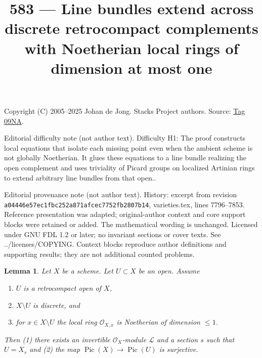 \documentclass{amsart}
\theoremstyle{plain}
\newtheorem{lemma}[subsection]{Lemma}
\theoremstyle{definition}
\theoremstyle{remark}
\numberwithin{equation}{subsection}
\def\Pic{\mathop{\mathrm{Pic}}\nolimits}
\begin{document}
\title[Stacks Project, Tag 09NA]{583 --- Line bundles extend across discrete retrocompact complements with Noetherian local rings of dimension at most one}
\maketitle
\noindent Copyright (C) 2005--2025 Johan de Jong. Stacks Project authors. Source: \href{https://stacks.math.columbia.edu/tag/09NA}{Tag 09NA}.

\noindent Editorial difficulty note (not author text). Difficulty H1: The proof constructs local equations that isolate each missing point even when the ambient scheme is not globally Noetherian. It glues these equations to a line bundle realizing the open complement and uses triviality of Picard groups on localized Artinian rings to extend arbitrary line bundles from that open..

\noindent Editorial provenance note (not author text). History: excerpt from revision \texttt{a0444\allowbreak 6e57e\allowbreak c1fbc\allowbreak 252a8\allowbreak 71afc\allowbreak ec775\allowbreak 2fb28\allowbreak 07b14}, varieties.tex, lines 7796--7853. Reference presentation was adapted; original-author context and core support blocks were retained or added. The mathematical wording is unchanged. Licensed under GNU FDL 1.2 or later; no invariant sections or cover texts. See ../licenses/COPYING. Context blocks reproduce author definitions and supporting results; they are not additional counted problems.

\begin{lemma}
\label{lemma-complement-codim-1-closed-points}
Let $X$ be a scheme. Let $U \subset X$ be an open. Assume
\begin{enumerate}
\item $U$ is a retrocompact open of $X$,
\item $X \setminus U$ is discrete, and
\item for $x \in X \setminus U$ the local ring
$\mathcal{O}_{X, x}$ is Noetherian of dimension $\leq 1$.
\end{enumerate}
Then (1) there exists an invertible $\mathcal{O}_X$-module $\mathcal{L}$
and a section $s$ such that $U = X_s$ and (2) the map
$\Pic(X) \to \Pic(U)$ is surjective.
\end{lemma}
\end{document}
